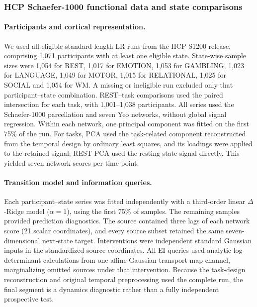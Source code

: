 \documentclass[fleqn,10pt]{wlscirep}
\begin{document}
\subsubsection{HCP Schaefer-1000 functional data and state comparisons}
\label{app:hcp_attribution}

\paragraph{Participants and cortical representation.}
We used all eligible standard-length LR runs from the HCP S1200 release, comprising 1,071 participants with at least one eligible state. State-wise sample sizes were 1,054 for REST, 1,017 for EMOTION, 1,053 for GAMBLING, 1,023 for LANGUAGE, 1,049 for MOTOR, 1,015 for RELATIONAL, 1,025 for SOCIAL and 1,054 for WM. A missing or ineligible run excluded only that participant--state combination. REST--task comparisons used the paired intersection for each task, with 1,001--1,038 participants. All series used the Schaefer-1000 parcellation and seven Yeo networks, without global signal regression. Within each network, one principal component was fitted on the first 75\% of the run. For tasks, PCA used the task-related component reconstructed from the temporal design by ordinary least squares, and its loadings were applied to the retained signal; REST PCA used the resting-state signal directly. This yielded seven network scores per time point.

\paragraph{Transition model and information queries.}
Each participant--state series was fitted independently with a third-order linear $\Delta$-Ridge model ($\alpha=1$), using the first 75\% of samples. The remaining samples provided prediction diagnostics. The source contained three lags of each network score (21 scalar coordinates), and every source subset retained the same seven-dimensional next-state target. Interventions were independent standard Gaussian inputs in the standardized source coordinates. All EI queries used analytic log-determinant calculations from one affine-Gaussian transport-map channel, marginalizing omitted sources under that intervention. Because the task-design reconstruction and original temporal preprocessing used the complete run, the final segment is a dynamics diagnostic rather than a fully independent prospective test.
\end{document}
